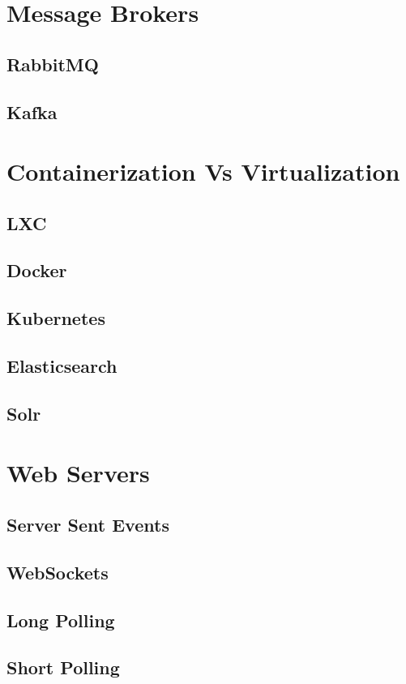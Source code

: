 \documentclass[a4paper]{article}
\begin{document}
    \newpage
    \section{Message Brokers}
    \subsection{RabbitMQ}
    \subsection{Kafka}

    \newpage
    \section{Containerization Vs Virtualization} 
    \subsection{LXC}
    \subsection{Docker}
    \subsection{Kubernetes}
    \subsection{Elasticsearch}
    \subsection{Solr}


    \newpage
    \section{Web Servers}
    \subsection{Server Sent Events}
    \subsection{WebSockets}
    \subsection{Long Polling}
    \subsection{Short Polling}
\end{document}
